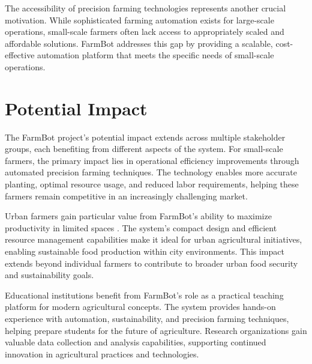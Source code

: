 The accessibility of precision farming technologies represents another crucial motivation. While sophisticated farming automation exists for large-scale operations, small-scale farmers often lack access to appropriately scaled and affordable solutions. FarmBot addresses this gap by providing a scalable, cost-effective automation platform that meets the specific needs of small-scale operations.

\section{Potential Impact}
The FarmBot project's potential impact extends across multiple stakeholder groups, each benefiting from different aspects of the system. For small-scale farmers, the primary impact lies in operational efficiency improvements through automated precision farming techniques. The technology enables more accurate planting, optimal resource usage, and reduced labor requirements, helping these farmers remain competitive in an increasingly challenging market.

Urban farmers gain particular value from FarmBot's ability to maximize productivity in limited spaces \cite{urban_farming2022}. The system's compact design and efficient resource management capabilities make it ideal for urban agricultural initiatives, enabling sustainable food production within city environments. This impact extends beyond individual farmers to contribute to broader urban food security and sustainability goals.

Educational institutions benefit from FarmBot's role as a practical teaching platform for modern agricultural concepts. The system provides hands-on experience with automation, sustainability, and precision farming techniques, helping prepare students for the future of agriculture. Research organizations gain valuable data collection and analysis capabilities, supporting continued innovation in agricultural practices and technologies.



